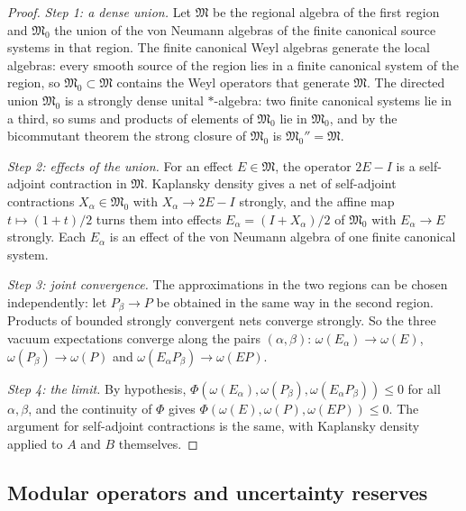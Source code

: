 \documentclass[11pt]{amsart}
\numberwithin{equation}{section}
\theoremstyle{definition}
\begin{document}
\begin{proof}
\emph{Step 1: a dense union.} Let \(\mathfrak M\) be the regional
algebra of the first region and \(\mathfrak M_0\) the union of the von
Neumann algebras of the finite canonical source systems in that region.
The finite canonical Weyl algebras generate the local algebras: every smooth source of the region lies in a finite
canonical system of the region, so \(\mathfrak M_0\subset\mathfrak M\)
contains the Weyl operators that generate \(\mathfrak M\). The directed
union \(\mathfrak M_0\) is a strongly dense unital \(*\)-algebra: two finite canonical
systems lie in a third, so sums and products of elements of
\(\mathfrak M_0\) lie in \(\mathfrak M_0\), and by the bicommutant
theorem the strong closure of \(\mathfrak M_0\) is
\(\mathfrak M_0''=\mathfrak M\).

\smallskip
\emph{Step 2: effects of the union.} For
an effect \(E\in\mathfrak M\), the operator \(2E-I\) is a self-adjoint
contraction in \(\mathfrak M\). Kaplansky density
\cite[Theorem~2.4.16]{BR87} gives a net of
self-adjoint contractions \(X_\alpha\in\mathfrak M_0\) with \(X_\alpha\to2E-I\)
strongly, and the affine map \(t\mapsto(1+t)/2\) turns them
into effects \(E_\alpha=(I+X_\alpha)/2\) of \(\mathfrak M_0\) with
\(E_\alpha\to E\) strongly. Each \(E_\alpha\) is an effect of the von
Neumann algebra of one finite canonical system.

\smallskip
\emph{Step 3: joint convergence.} The approximations in the two regions
can be chosen independently: let \(P_\beta\to P\) be obtained in the
same way in the second region. Products of bounded strongly convergent
nets converge strongly. So the
three vacuum expectations converge along the pairs \((\alpha,\beta)\):
\(\omega(E_\alpha)\to\omega(E)\), \(\omega(P_\beta)\to\omega(P)\) and
\(\omega(E_\alpha P_\beta)\to\omega(EP)\).

\smallskip
\emph{Step 4: the limit.} By hypothesis,
\(\Phi(\omega(E_\alpha),\omega(P_\beta),\omega(E_\alpha P_\beta))\le0\)
for all \(\alpha,\beta\), and the continuity of \(\Phi\) gives
\(\Phi(\omega(E),\omega(P),\omega(EP))\le0\). The argument for
self-adjoint contractions is the same, with Kaplansky density applied to
\(A\) and \(B\) themselves.
\end{proof}

\subsection{Modular operators and uncertainty reserves}
\end{document}
